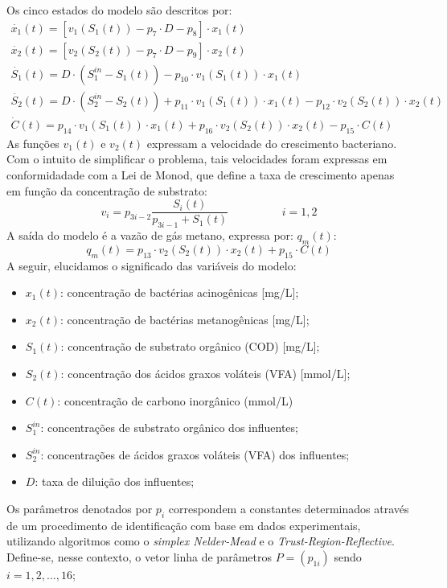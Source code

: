\documentclass[a0,portrait]{a0poster}
\begin{document}
\begin{multicols}{2}
\quad Os cinco estados do modelo são descritos por:
\begin{gather}
\dot{x_{1}}(t)=[v_{1}(S_{1}(t))-p_7 \cdot D - p_8]\cdot x_1(t)\\
\dot{x_{2}}(t)=[v_{2}(S_{2}(t))-p_7 \cdot D - p_9]\cdot x_2(t)\\
\dot{S_{1}}(t)=D\cdot(S_{1}^{in} - S_{1}(t)) - p_{10} \cdot v_{1}(S_{1}(t))\cdot x_1(t)\\
\dot{S_{2}}(t)=D \cdot (S_{2}^{in} - S_{2}(t)) + p_{11}\cdot v_{1}(S_{1}(t)) \cdot x_1(t) - p_{12} \cdot v_{2}(S_{2}(t)) \cdot x_2(t) \\
\dot{C}(t)= p_{14} \cdot v_{1}(S_{1}(t)) \cdot {x_{1}}(t) + p_{16} \cdot v_{2}(S_{2}(t)) \cdot {x_{2}}(t) - p_{15} \cdot C(t)
\end{gather}
\quad As funções $v_1(t)$ e $v_2(t)$ expressam a velocidade do crescimento bacteriano. Com o intuito de simplificar o problema, tais velocidades foram expressas em conformidadade com a Lei de Monod, que define a taxa de crescimento apenas em função da concentração de substrato:
\begin{equation}
v_i = p_{3i-2}\frac{S_i(t)}{p_{3i-1}+S_1(t)}  \hspace{2cm} i=1,2
\end{equation}
\quad A saída do modelo é a vazão de gás metano, expressa por: $q_m(t)$:\\
\begin{equation}
q_m(t) = p_{13}\cdot v_{2}(S_{2}(t)) \cdot x_2(t) + p_{15} \cdot C(t)
\end{equation}
\quad A seguir, elucidamos o significado das variáveis do modelo:
\begin{itemize}
\item $x_1(t)$: concentração de bactérias acinogênicas [mg/L];
\item $x_2(t)$: concentração de bactérias metanogênicas [mg/L];
\item $S_1(t)$: concentração de substrato orgânico (COD) [mg/L];
\item $S_2(t)$: concentração dos ácidos graxos voláteis (VFA) [mmol/L];
\item $C(t)$: concentração de carbono inorgânico (mmol/L)
\item $S_1^{in}$: concentrações de substrato orgânico dos influentes;
\item $S_2^{in}$: concentrações de ácidos graxos voláteis (VFA) dos influentes;
\item $D$: taxa de diluição dos influentes;
\end{itemize}
\quad Os parâmetros denotados por $p_i$ correspondem a constantes determinados através de um procedimento de identificação com base em dados experimentais, utilizando algoritmos como o \textit{simplex Nelder-Mead} e o \textit{Trust-Region-Reflective}. Define-se, nesse contexto, o vetor linha de parâmetros $P = (p_{1i})$ sendo $i=1,2,...,16$;


\end{multicols}
\end{document}
